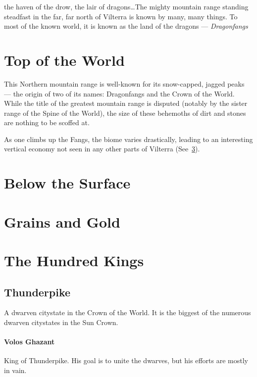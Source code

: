 \documentclass[../main.tex]{subfiles}
\begin{document}
 the haven of the drow,
the lair of dragons\ldots The mighty mountain range standing steadfast in the far,
far north of Vilterra is known by many, many things. To
most of the known world, it is known as the land of the
dragons --- \emph{Dragonfangs}

\section{Top of the World}
This Northern mountain range is well-known for its snow-capped, jagged peaks ---
the origin of two of its names: Dragonfangs and the Crown of the World.
While the title of the greatest mountain range is disputed (notably by the
sister range of the Spine of the World), the size of these behemoths of
dirt and stones are nothing to be scoffed at.

As one climbs up the Fangs, the biome varies drastically, leading to an interesting
vertical economy not seen in any other parts of Vilterra
(See~\ref{sec:grainsandgold}).


\section{Below the Surface}

\section{Grains and Gold}\label{sec:grainsandgold}

\section{The Hundred Kings}	%

\subsection{Thunderpike}
A dwarven citystate in the Crown of the World. It is the
biggest of the numerous dwarven citystates in the
Sun Crown.

\paragraph{Volos Ghazant}
King of Thunderpike. His goal is to unite the dwarves, but
his efforts are mostly in vain.
\end{document}
